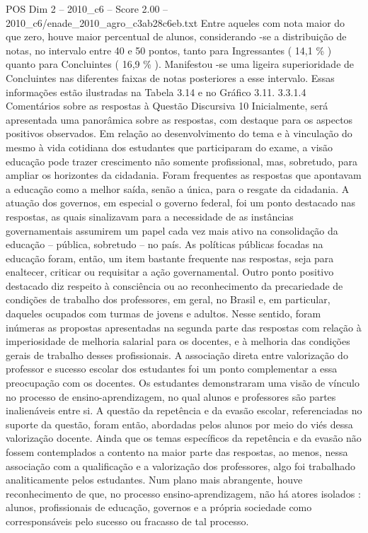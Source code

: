 \begin{textsample}{POS Dim 2 – 2010\_c6 – Score 2.00 – 2010\_c6/enade\_2010\_agro\_c3ab28c6eb.txt}
Entre aqueles com nota maior do que zero, houve maior percentual de alunos, considerando -se a distribuição de notas, no intervalo entre 40 e 50 pontos, tanto para Ingressantes ( 14,1 \% ) quanto para Concluintes ( 16,9 \% ).
Manifestou -se uma ligeira superioridade de Concluintes nas diferentes faixas de notas posteriores a esse intervalo.
Essas informações estão ilustradas na Tabela 3.14 e no Gráfico 3.11. 3.3.1.4 Comentários sobre as respostas à Questão Discursiva 10 Inicialmente, será apresentada uma panorâmica sobre as respostas, com destaque para os aspectos positivos observados.
Em relação ao desenvolvimento do tema e à vinculação do mesmo à vida cotidiana dos estudantes que participaram do exame, a visão educação pode trazer crescimento não somente profissional, mas, sobretudo, para ampliar os horizontes da cidadania.
Foram frequentes as respostas que apontavam a educação como a melhor saída, senão a única, para o resgate da cidadania.
A atuação dos governos, em especial o governo federal, foi um ponto destacado nas respostas, as quais sinalizavam para a necessidade de as instâncias governamentais assumirem um papel cada vez mais ativo na consolidação da educação – pública, sobretudo – no país.
As políticas públicas focadas na educação foram, então, um item bastante frequente nas respostas, seja para enaltecer, criticar ou requisitar a ação governamental.
Outro ponto positivo destacado diz respeito à consciência ou ao reconhecimento da precariedade de condições de trabalho dos professores, em geral, no Brasil e, em particular, daqueles ocupados com turmas de jovens e adultos.
Nesse sentido, foram inúmeras as propostas apresentadas na segunda parte das respostas com relação à imperiosidade de melhoria salarial para os docentes, e à melhoria das condições gerais de trabalho desses profissionais.
A associação direta entre valorização do professor e sucesso escolar dos estudantes foi um ponto complementar a essa preocupação com os docentes.
Os estudantes demonstraram uma visão de vínculo no processo de ensino-aprendizagem, no qual alunos e professores são partes inalienáveis entre si.
A questão da repetência e da evasão escolar, referenciadas no suporte da questão, foram então, abordadas pelos alunos por meio do viés dessa valorização docente.
Ainda que os temas específicos da repetência e da evasão não fossem contemplados a contento na maior parte das respostas, ao menos, nessa associação com a qualificação e a valorização dos professores, algo foi trabalhado analiticamente pelos estudantes.
Num plano mais abrangente, houve reconhecimento de que, no processo ensino-aprendizagem, não há atores isolados : alunos, profissionais de educação, governos e a própria sociedade como corresponsáveis pelo sucesso ou fracasso de tal processo.

\end{textsample}
